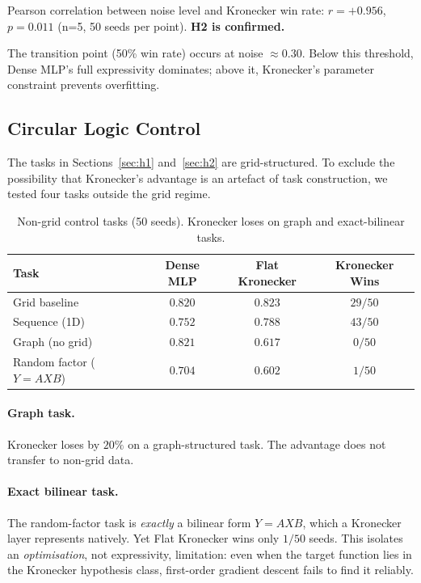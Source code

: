 \documentclass[11pt,a4paper]{article}
\begin{document}
Pearson correlation between noise level and Kronecker win rate:
$r = +0.956$, $p = 0.011$ (n=5, 50 seeds per point).
\textbf{H2 is confirmed.}

The transition point (50\% win rate) occurs at noise
$\approx 0.30$. Below this threshold, Dense MLP's full
expressivity dominates; above it, Kronecker's parameter
constraint prevents overfitting.


\subsection{Circular Logic Control}
\label{sec:non-grid}

The tasks in Sections~\ref{sec:h1} and~\ref{sec:h2} are
grid-structured. To exclude the possibility that Kronecker's
advantage is an artefact of task construction, we tested four
tasks outside the grid regime.

\begin{table}[h]
\centering
\caption{Non-grid control tasks (50 seeds). Kronecker loses on
graph and exact-bilinear tasks.}
\label{tab:non-grid}
\small
\begin{tabular}{lccc}
\toprule
Task & Dense MLP & Flat Kronecker & Kronecker Wins \\
\midrule
Grid baseline             & $0.820$ & $0.823$ & $29/50$ \\
Sequence (1D)             & $0.752$ & $\mathbf{0.788}$ & $43/50$ \\
Graph (no grid)           & $\mathbf{0.821}$ & $0.617$ & $0/50$ \\
Random factor ($Y=AXB$)   & $\mathbf{0.704}$ & $0.602$ & $1/50$ \\
\bottomrule
\end{tabular}
\end{table}

\paragraph{Graph task.}
Kronecker loses by $20\%$ on a graph-structured task. The
advantage does not transfer to non-grid data.

\paragraph{Exact bilinear task.}
The random-factor task is \emph{exactly} a bilinear form
$Y = AXB$, which a Kronecker layer represents natively. Yet
Flat Kronecker wins only $1/50$ seeds. This isolates an
\emph{optimisation}, not expressivity, limitation: even when
the target function lies in the Kronecker hypothesis class,
first-order gradient descent fails to find it reliably.
\end{document}

